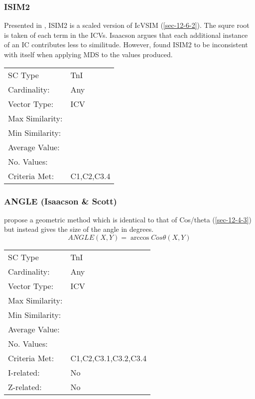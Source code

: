 \documentclass{article}
\begin{document}
\subsubsection{ISIM2}
\label{sec-12-6-3}

Presented in \citet{Isaacson1996}, ISIM2 is a scaled version of IcVSIM
(\ref{sec-12-6-2}). The squre root is taken of each term in the ICVs. Isaacson
argues that each additional instance of an IC contributes less to
similitude. However, \citet{Samplaski2005a} found ISIM2 to be
inconsistent with itself when applying MDS to the values produced.

\begin{center}
\begin{tabular}{ll}
 SC Type          &  TnI         \\
 Cardinality:     &  Any         \\
 Vector Type:     &  ICV         \\
 Max Similarity:  &              \\
 Min Similarity:  &              \\
 Average Value:   &              \\
 No. Values:      &              \\
 Criteria Met:    &  C1,C2,C3.4  \\
\end{tabular}
\end{center}
\subsubsection{ANGLE (Isaacson \& Scott)}
\label{sec-12-6-4}

\citet{Scott1998} propose a geometric method which is identical to
that of Cos/theta (\ref{sec-12-4-3}) but instead gives the size of the
angle in degrees. $$ANGLE(X,Y) = \arccos{Cos\theta(X,Y)}$$

\begin{center}
\begin{tabular}{ll}
 SC Type          &  TnI                   \\
 Cardinality:     &  Any                   \\
 Vector Type:     &  ICV                   \\
 Max Similarity:  &                        \\
 Min Similarity:  &                        \\
 Average Value:   &                        \\
 No. Values:      &                        \\
 Criteria Met:    &  C1,C2,C3.1,C3.2,C3.4  \\
 I-related:       &  No                    \\
 Z-related:       &  No                    \\
\end{tabular}
\end{center}
\end{document}
